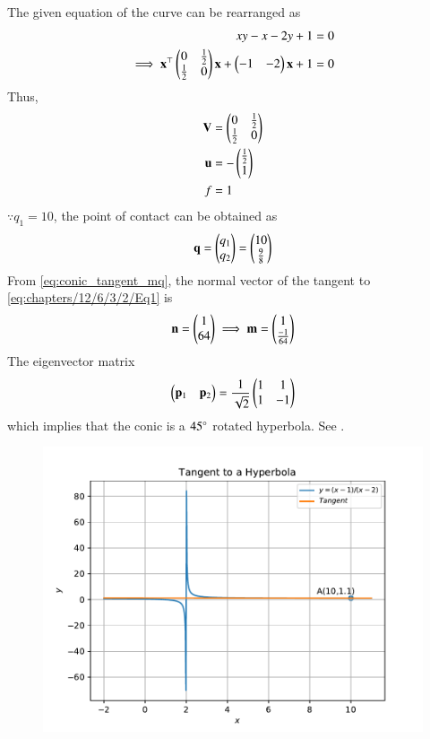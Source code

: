 The given equation of the curve can be rearranged as
\begin{align}
	xy-x-2y+1 &= 0 \\
        \label{eq:chapters/12/6/3/2/Eq1}
	\implies \mathbf{x}^\top\begin{pmatrix}0 & \frac{1}{2} \\ \frac{1}{2} & 0\end{pmatrix}\mathbf{x} + \begin{pmatrix}-1 & -2\end{pmatrix}\mathbf{x}+1 &= 0 
\end{align}
Thus, 
\begin{align}
	\mathbf{V} &= \begin{pmatrix} 0 & \frac{1}{2} \\ \frac{1}{2} & 0\end{pmatrix} \\
	\mathbf{u} &= -\begin{pmatrix}\frac{1}{2} \\ 1\end{pmatrix} \\
	f &= 1 
\end{align}
$\because q_1 = 10$, the point of contact can be obtained as
\begin{align}
	 \mathbf{q} =\begin{pmatrix}q_1 \\ q_2\end{pmatrix} = \begin{pmatrix}10 \\ \frac{9}{8}\end{pmatrix}
\end{align}
  From \eqref{eq:conic_tangent_mq},
 the normal vector of the tangent to \eqref{eq:chapters/12/6/3/2/Eq1} is
\begin{align}
	\mathbf{n} = \begin{pmatrix}1 \\ 64\end{pmatrix}
	\implies
	\mathbf{m} = \begin{pmatrix}1 \\ \frac{-1}{64}\end{pmatrix}
\end{align}
The eigenvector matrix 
\begin{align}
	\begin{pmatrix}\mathbf{p}_1 & \mathbf{p}_2\end{pmatrix} = \frac{1}{\sqrt{2}}\begin{pmatrix}1 & 1 \\ 1 & -1\end{pmatrix}
\end{align}
which implies that  the conic is a $45\degree$ rotated hyperbola.
See .
\begin{figure}[!h]
	\begin{center}
		\includegraphics[width=\columnwidth]{chapters/12/6/3/2/figs/problem2.pdf}
	\end{center}
\caption{}
\label{fig:chapters/12/6/3/2/Fig1}
\end{figure}

